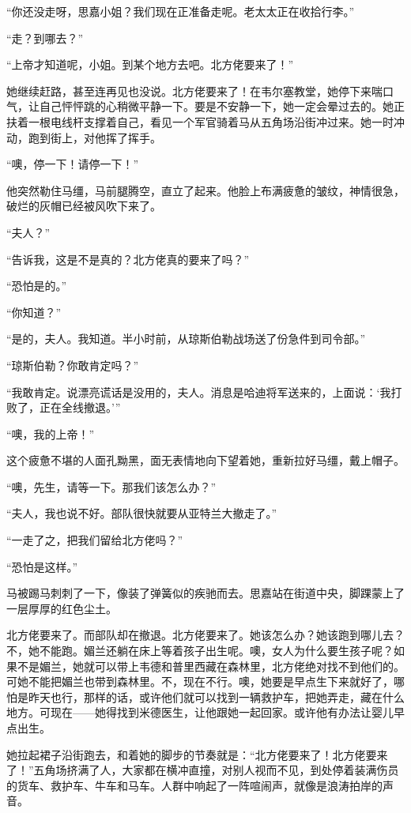 \par “你还没走呀，思嘉小姐？我们现在正准备走呢。老太太正在收拾行李。”
\par “走？到哪去？”
\par “上帝才知道呢，小姐。到某个地方去吧。北方佬要来了！”
\par 她继续赶路，甚至连再见也没说。北方佬要来了！在韦尔塞教堂，她停下来喘口气，让自己怦怦跳的心稍微平静一下。要是不安静一下，她一定会晕过去的。她正扶着一根电线杆支撑着自己，看见一个军官骑着马从五角场沿街冲过来。她一时冲动，跑到街上，对他挥了挥手。
\par “噢，停一下！请停一下！”
\par 他突然勒住马缰，马前腿腾空，直立了起来。他脸上布满疲惫的皱纹，神情很急，破烂的灰帽已经被风吹下来了。
\par “夫人？”
\par “告诉我，这是不是真的？北方佬真的要来了吗？”
\par “恐怕是的。”
\par “你知道？”
\par “是的，夫人。我知道。半小时前，从琼斯伯勒战场送了份急件到司令部。”
\par “琼斯伯勒？你敢肯定吗？”
\par “我敢肯定。说漂亮谎话是没用的，夫人。消息是哈迪将军送来的，上面说：‘我打败了，正在全线撤退。'”
\par “噢，我的上帝！”
\par 这个疲惫不堪的人面孔黝黑，面无表情地向下望着她，重新拉好马缰，戴上帽子。
\par “噢，先生，请等一下。那我们该怎么办？”
\par “夫人，我也说不好。部队很快就要从亚特兰大撤走了。”
\par “一走了之，把我们留给北方佬吗？”
\par “恐怕是这样。”
\par 马被踢马刺刺了一下，像装了弹簧似的疾驰而去。思嘉站在街道中央，脚踝蒙上了一层厚厚的红色尘土。
\par 北方佬要来了。而部队却在撤退。北方佬要来了。她该怎么办？她该跑到哪儿去？不，她不能跑。媚兰还躺在床上等着孩子出生呢。噢，女人为什么要生孩子呢？如果不是媚兰，她就可以带上韦德和普里西藏在森林里，北方佬绝对找不到他们的。可她不能把媚兰也带到森林里。不，现在不行。噢，她要是早点生下来就好了，哪怕是昨天也行，那样的话，或许他们就可以找到一辆救护车，把她弄走，藏在什么地方。可现在——她得找到米德医生，让他跟她一起回家。或许他有办法让婴儿早点出生。
\par 她拉起裙子沿街跑去，和着她的脚步的节奏就是：“北方佬要来了！北方佬要来了！”五角场挤满了人，大家都在横冲直撞，对别人视而不见，到处停着装满伤员的货车、救护车、牛车和马车。人群中响起了一阵喧闹声，就像是浪涛拍岸的声音。
